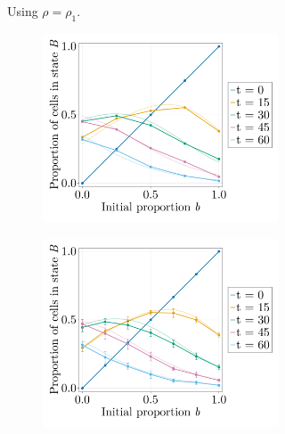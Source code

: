 \begin{figure}[p]
\begin{subfigure}{\textwidth}
\begin{subfigure}{0.47\textwidth}
        \end{subfigure}
        \caption{Using $\rho=\rho_1$.}
    \end{subfigure}
    \vspace{0.5em}
    \begin{subfigure}{\textwidth}
        \centering
        \begin{subfigure}{0.47\textwidth}
            \centering
            \includegraphics[width=\textwidth]{figures/407/407-phib-vs-b-simulation-1ite-fp50-vs-meanfield.png}
        \end{subfigure}
        \hfill
        \begin{subfigure}{0.47\textwidth}
            \centering
            \includegraphics[width=\textwidth]{figures/408/408-phib-vs-b-simulation-10ite-fp50-cellcell-vs-meanfield.png}

\end{subfigure}
\end{subfigure}
\end{figure}
